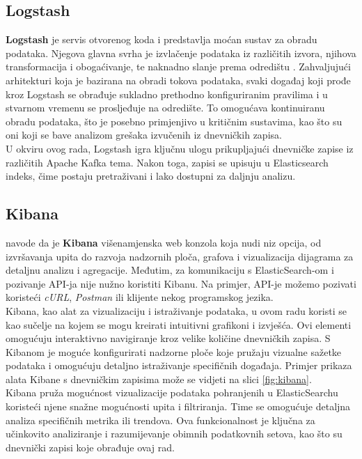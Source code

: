 \documentclass[times, utf8, diplomski]{fer}
\begin{document}
\subsection{Logstash}
\label{sec:logstash}

\textbf{Logstash} je servis otvorenog koda i predstavlja moćan sustav za obradu podataka. Njegova glavna svrha je izvlačenje podataka iz različitih izvora, njihova transformacija i obogaćivanje, te naknadno slanje prema odredištu \citep{konda_elasticsearch_2023}. Zahvaljujući arhitekturi koja je bazirana na obradi tokova podataka, svaki događaj koji prođe kroz Logstash se obrađuje sukladno prethodno konfiguriranim pravilima i u stvarnom vremenu se prosljeđuje na odredište. To omogućava kontinuiranu obradu podataka, što je posebno primjenjivo u kritičnim sustavima, kao što su oni koji se bave analizom grešaka izvučenih iz dnevničkih zapisa.\\

U okviru ovog rada, Logstash igra ključnu ulogu prikupljajući dnevničke zapise iz različitih Apache Kafka tema. Nakon toga, zapisi se upisuju u Elasticsearch indeks, čime postaju pretraživani i lako dostupni za daljnju analizu.

\subsection{Kibana}
\label{sec:kibana}

\citet{gormley_elasticsearch_2015} navode da je \textbf{Kibana} višenamjenska web konzola koja nudi niz opcija, od izvršavanja upita do razvoja nadzornih ploča, grafova i vizualizacija dijagrama za detaljnu analizu i agregacije. Međutim, za komunikaciju s ElasticSearch-om i pozivanje API-ja nije nužno koristiti Kibanu. Na primjer, API-je možemo pozivati koristeći \emph{cURL}, \emph{Postman} ili klijente nekog programskog jezika.\\

Kibana, kao alat za vizualizaciju i istraživanje podataka, u ovom radu koristi se kao sučelje na kojem se mogu kreirati intuitivni grafikoni i izvješća. Ovi elementi omogućuju interaktivno navigiranje kroz velike količine dnevničkih zapisa. S Kibanom je moguće konfigurirati nadzorne ploče koje pružaju vizualne sažetke podataka i omogućuju detaljno istraživanje specifičnih događaja. Primjer prikaza alata Kibane s dnevničkim zapisima može se vidjeti na slici \ref{fig:kibana}.\\

Kibana pruža mogućnost vizualizacije podataka pohranjenih u ElasticSearchu koristeći njene snažne mogućnosti upita i filtriranja. Time se omogućuje detaljna analiza specifičnih metrika ili trendova. Ova funkcionalnost je ključna za učinkovito analiziranje i razumijevanje obimnih podatkovnih setova, kao što su dnevnički zapisi koje obrađuje ovaj rad.
\end{document}
